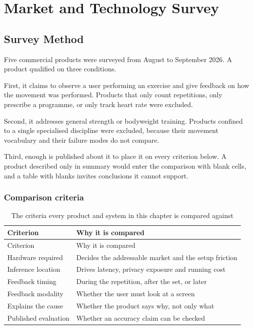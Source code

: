 \chapter{Market and Technology Survey}
\label{chap:2}

\section{Survey Method}
\label{sec:2.1}

Five commercial products were surveyed from August to September 2026. A product qualified on three conditions.

First, it claims to observe a user performing an exercise and give feedback on how the movement was performed. Products that only count repetitions, only prescribe a programme, or only track heart rate were excluded.

Second, it addresses general strength or bodyweight training. Products confined to a single specialised discipline were excluded, because their movement vocabulary and their failure modes do not compare.

Third, enough is published about it to place it on every criterion below. A product described only in summary would enter the comparison with blank cells, and a table with blanks invites conclusions it cannot support.

\subsection{Comparison criteria}
\label{sec:2.1.1}

{\small
\setlength{\LTpre}{6pt}\setlength{\LTpost}{8pt}
\begin{longtable}{>{\raggedright\arraybackslash}p{}>{\raggedright\arraybackslash}p{}}
\caption{The criteria every product and system in this chapter is compared against}\\
\toprule
Criterion & Why it is compared \\
\midrule
\endfirsthead
\toprule
Criterion & Why it is compared \\
\midrule
\endhead
\bottomrule
\endfoot
\bottomrule
\endlastfoot
Hardware required & Decides the addressable market and the setup friction \\
Inference location & Drives latency, privacy exposure and running cost \\
Feedback timing & During the repetition, after the set, or later \\
Feedback modality & Whether the user must look at a screen \\
Explains the cause & Whether the product says why, not only what \\
Published evaluation & Whether an accuracy claim can be checked \\
\end{longtable}
}

